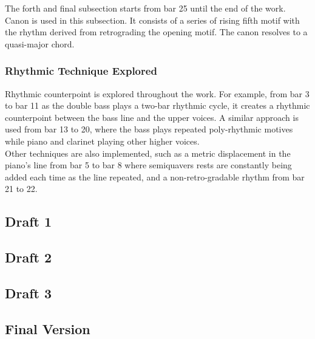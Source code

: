 \documentclass{article}
\begin{document}
The forth and final subsection starts from bar 25 until the end of the work.
Canon is used in this subsection. It consists of a series of rising fifth motif
with the rhythm derived from retrograding the opening motif. The canon resolves
to a quasi-major chord.\\

\subsubsection{Rhythmic Technique Explored} Rhythmic counterpoint is explored
throughout the work. For example, from bar 3 to bar 11 as the double bass plays
a two-bar rhythmic cycle, it creates a rhythmic counterpoint between the bass
line and the upper voices. A similar approach is used from bar 13 to 20, where
the bass plays repeated poly-rhythmic motives while piano and clarinet playing
other higher voices.\\

Other techniques are also implemented, such as a metric displacement in the
piano's line from bar 5 to bar 8 where semiquavers rests are constantly being
added each time as the line repeated, and a non-retro-gradable rhythm from bar
21 to 22.\\

\newpage
\begin{center}
\vspace*{\fill}
\LARGE
\subsection{Draft 1}
\vspace*{\fill}
%
\end{center}
\newpage
\begin{center}
\vspace*{\fill}
\LARGE
\subsection{Draft 2}
\vspace*{\fill}
%
\end{center}
\newpage
\begin{center}
\vspace*{\fill}
\LARGE
\subsection{Draft 3}
\vspace*{\fill}
%
\end{center}
\newpage
\begin{center}
\vspace*{\fill}
\LARGE
\subsection{Final Version}
\vspace*{\fill}
%
\end{center}

\end{document}
